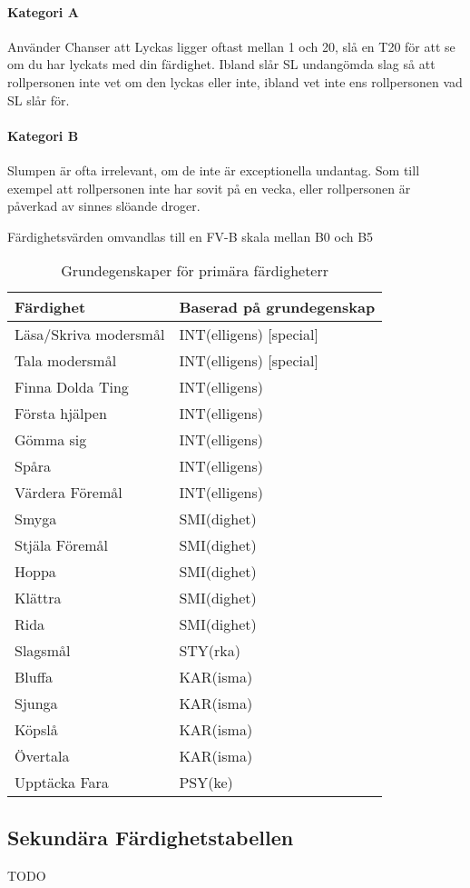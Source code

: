 \documentclass[a4paper, 10pt, titlepage]{article}
\begin{document}
\paragraph{Kategori A} Använder Chanser att Lyckas ligger oftast mellan 1 och 20, slå en T20 för att
se om du har lyckats med din färdighet. Ibland slår SL undangömda slag så att rollpersonen inte vet om
den lyckas eller inte, ibland vet inte ens rollpersonen vad SL slår för.

\paragraph{Kategori B} Slumpen är ofta irrelevant, om de inte är exceptionella undantag. Som till exempel
att rollpersonen inte har sovit på en vecka, eller rollpersonen är påverkad av sinnes slöande droger.

Färdighetsvärden omvandlas till en FV-B skala mellan B0 och B5

\begin{table}[hbp]
  \caption{Grundegenskaper för primära färdigheterr}
  \begin{tabular}{|l|l|}
    \hline
    Färdighet         & Baserad på grundegenskap \\
    \hline
    Läsa/Skriva modersmål & INT(elligens) [special] \\
    Tala modersmål        & INT(elligens) [special] \\
    Finna Dolda Ting  & INT(elligens) \\
    Första hjälpen    & INT(elligens) \\
    Gömma sig         & INT(elligens) \\
    Spåra             & INT(elligens) \\
    Värdera Föremål   & INT(elligens) \\
    Smyga             & SMI(dighet) \\
    Stjäla Föremål    & SMI(dighet) \\
    Hoppa             & SMI(dighet)   \\
    Klättra           & SMI(dighet)   \\
    Rida              & SMI(dighet) \\
    Slagsmål          & STY(rka) \\
    Bluffa            & KAR(isma) \\
    Sjunga            & KAR(isma) \\
    Köpslå            & KAR(isma)  \\
    Övertala          & KAR(isma) \\
    Upptäcka Fara     & PSY(ke) \\
  \end{tabular}
\end{table}

\subsection{Sekundära Färdighetstabellen}

TODO
\end{document}
